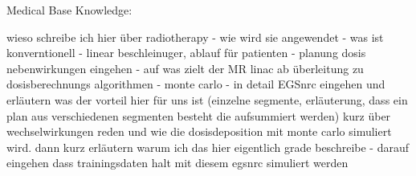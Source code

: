 Medical Base Knowledge:

wieso schreibe ich hier über radiotherapy - wie wird sie angewendet - was ist konverntionell - linear beschleinuger, ablauf für patienten - planung dosis nebenwirkungen eingehen - auf was zielt der MR linac ab überleitung zu dosisberechnungs algorithmen - monte carlo - in detail EGSnrc eingehen und erläutern was der vorteil hier für uns ist (einzelne segmente, erläuterung, dass ein plan aus verschiedenen segmenten besteht die aufsummiert werden)
kurz über wechselwirkungen reden und wie die dosisdeposition mit monte carlo simuliert wird.  dann kurz erläutern warum ich das hier eigentlich grade beschreibe - darauf eingehen dass trainingsdaten halt mit diesem egsnrc simuliert werden 